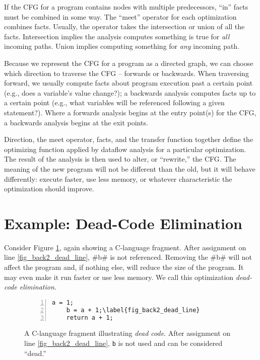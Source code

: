 \documentclass[12pt]{report}
\begin{document}
If the CFG for a program contains nodes with multiple predecessors,
``in'' facts must be combined in some way. The ``meet'' operator for
each optimization combines facts. Usually, the operator takes the
intersection or union of all the facts. Intersection implies the
analysis computes something is true for \emph{all} incoming paths. Union
implies computing something for \emph{any} incoming path.

Because we represent the CFG for a program as a directed graph, we can
choose which direction to traverse the CFG -- forwards or backwards.
When traversing forward, we usually compute facts about program
execution past a certain point (e.g., does a variable's value
change?); a backwards analysis computes facts up to a certain point
(e.g., what variables will be referenced following a given
statement?). Where a forwards analysis begins at the entry point(s)
for the CFG, a backwards analysis begins at the exit points.

Direction, the meet operator, facts, and the transfer function
together define the optimizing function applied by dataflow analysis
for a particular optimization. The result of the analysis is then used
to alter, or ``rewrite,'' the CFG. The meaning of the new program will
not be different than the old, but it will behave differently: execute
faster, use less memory, or whatever characteristic the optimization
should improve.

\section{Example: Dead-Code Elimination}

Consider Figure \ref{fig_back2}, again showing a C-language fragment.
After assignment on line \ref{fig_back2_dead_line}, #b# is not
referenced. Removing the #b# will not affect the program and,
if nothing else, will reduce the size of the program. It may even make
it run faster or use less memory. We call this optimization
\emph{dead-code elimination}.

\begin{figure}[ht]\centering
\figbegin
\begin{minipage}{1in}
  \begin{Verbatim}[numbers=left,commandchars=\\\{\}]
    a = 1;
    b = a + 1;\label{fig_back2_dead_line}
    return a + 1;
  \end{Verbatim}
\end{minipage}
\caption{A C-language fragment illustrating \emph{dead code}. After
assignment on line \ref{fig_back2_dead_line}, \verb=b= is not used
and can be considered ``dead.''}
\label{fig_back2}
\figend
\end{figure}
\end{document}
